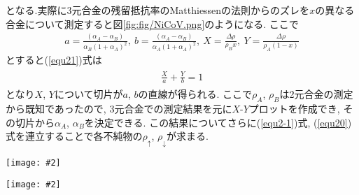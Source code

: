 \documentclass[uplatex,a4j,11pt,dvipdfmx]{jsarticle}
\makeatletter
\def\fgcaption{\def\@captype{figure}\caption}
\newcommand{\mfig}[3][width=15cm]{
\begin{center}
\texttt{[image: \#2]}
\fgcaption{#3 \label{fig:#2}}
\end{center}
}
\makeatother
\begin{document}
となる.実際に3元合金の残留抵抗率のMatthiessenの法則からのズレを$x$の異なる合金について測定すると図\ref{fig:fig/NiCoV.png}のようになる.
ここで
\begin{align}
  a=\frac{(\alpha_A-\alpha_B)}{\alpha_B(1+\alpha_A)^2},\ b=\frac{(\alpha_A-\alpha_B)}{\alpha_A(1+\alpha_A)^2},\ X=\frac{\Delta\rho}{\rho_Bx},\ Y=\frac{\Delta\rho}{\rho_A(1-x)}
\end{align}
とすると(\ref{equ21})式は
\begin{align}
  \begin{split}
    \frac{X}{a}+\frac{Y}{b}=1
  \end{split}
\end{align}
となり$X$, $Y$について切片が$a$, $b$の直線が得られる.
ここで$\rho_A$, $\rho_B$は2元合金の測定から既知であったので,
3元合金での測定結果を元に$X$-$Y$プロットを作成でき,
その切片から$\alpha_A$, $\alpha_B$を決定できる.
この結果についてさらに(\ref{equ2-1})式, (\ref{equ20})式を連立することで各不純物の$\rho_\uparrow$, $\rho_\downarrow$が求まる.\cite{kiso}\cite{fert_electrical_1976}
\mfig[width=8cm]{fig/2cm_3.png}{2流体モデルでの3元素合金の抵抗率の計算}
\mfig[width=8cm]{fig/NiCoV.png}{${\rm NiCo}_{1-x}{\rm V}_x$合金の残留抵抗率のMatthiessenの法則からのズレ\cite{fert_electrical_1976}}
\clearpage
\end{document}
